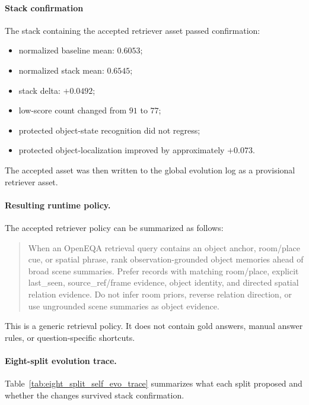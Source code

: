 \paragraph{Stack confirmation}
The stack containing the accepted retriever asset passed confirmation:
\begin{itemize}
    \item normalized baseline mean: $0.6053$;
    \item normalized stack mean: $0.6545$;
    \item stack delta: $+0.0492$;
    \item low-score count changed from $91$ to $77$;
    \item protected object-state recognition did not regress;
    \item protected object-localization improved by approximately $+0.073$.
\end{itemize}
The accepted asset was then written to the global evolution log as a provisional retriever asset.

\paragraph{Resulting runtime policy.}
The accepted retriever policy can be summarized as follows:
\begin{quote}
\small
\ttfamily
When an OpenEQA retrieval query contains an object anchor, room/place cue, or spatial phrase, rank observation-grounded object memories ahead of broad scene summaries. Prefer records with matching room/place, explicit last\_seen, source\_ref/frame evidence, object identity, and directed spatial relation evidence. Do not infer room priors, reverse relation direction, or use ungrounded scene summaries as object evidence.
\end{quote}
This is a generic retrieval policy. It does not contain gold answers, manual answer rules, or question-specific shortcuts.



\paragraph{Eight-split evolution trace.}



Table~\ref{tab:eight_split_self_evo_trace} summarizes what each split proposed and whether the changes survived stack confirmation.


